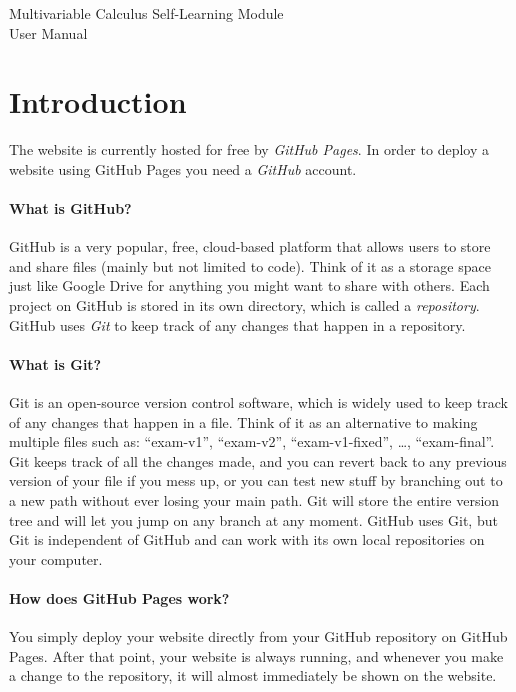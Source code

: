 \documentclass[a4paper,10pt]{article}
\begin{document}
\begingroup
\centering
\LARGE Multivariable Calculus Self-Learning Module\\[1em]
\large User Manual\par
\vspace{32pt}
\endgroup

\tableofcontents

\clearpage

\section{Introduction}

The website is currently hosted for free by \emph{GitHub Pages}. In order to deploy a website using GitHub Pages you need a \emph{GitHub} account. 

\paragraph{What is GitHub?} GitHub is a very popular, free, cloud-based platform that allows users to store and share files (mainly but not limited to code). Think of it as a storage space just like Google Drive for anything you might want to share with others. Each project on GitHub is stored in its own directory, which is called a \emph{repository}. GitHub uses \emph{Git} to keep track of any changes that happen in a repository.

\paragraph{What is Git?} Git is an open-source version control software, which is widely used to keep track of any changes that happen in a file. Think of it as an alternative to making multiple files such as: ``exam-v1'', ``exam-v2'', ``exam-v1-fixed'', \dots, ``exam-final''. Git keeps track of all the changes made, and you can revert back to any previous version of your file if you mess up, or you can test new stuff by branching out to a new path without ever losing your main path. Git will store the entire version tree and will let you jump on any branch at any moment. GitHub uses Git, but Git is independent of GitHub and can work with its own local repositories on your computer.

\paragraph{How does GitHub Pages work?} You simply deploy your website directly from your GitHub repository on GitHub Pages. After that point, your website is always running, and whenever you make a change to the repository, it will almost immediately be shown on the website.
\end{document}
